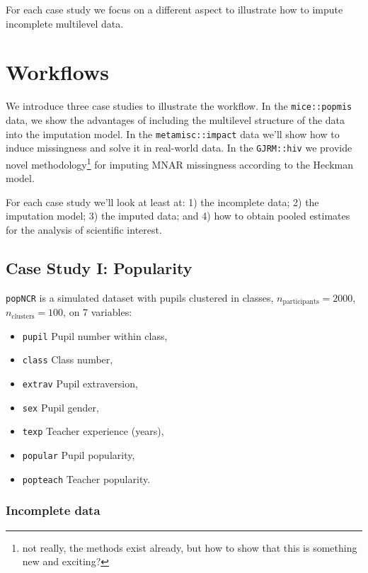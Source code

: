 \documentclass[
]{jss}
\providecommand{\tightlist}{%
  \setlength{\itemsep}{0pt}\setlength{\parskip}{0pt}}
\begin{document}
For each case study we focus on a different aspect to illustrate how to
impute incomplete multilevel data.

\hypertarget{workflows}{%
\section{Workflows}\label{workflows}}

We introduce three case studies to illustrate the workflow. In the
\texttt{mice::popmis} data, we show the advantages of including the
multilevel structure of the data into the imputation model. In the
\texttt{metamisc::impact} data we'll show how to induce missingness and
solve it in real-world data. In the \texttt{GJRM::hiv} we provide novel
methodology\footnote{not really, the methods exist already, but how to
  show that this is something new and exciting?} for imputing MNAR
missingness according to the Heckman model.

For each case study we'll look at least at: 1) the incomplete data; 2)
the imputation model; 3) the imputed data; and 4) how to obtain pooled
estimates for the analysis of scientific interest.

\hypertarget{case-study-i-popularity}{%
\subsection{Case Study I: Popularity}\label{case-study-i-popularity}}

\texttt{popNCR} is a simulated dataset with pupils clustered in classes,
\(n_{\text{participants}} = 2000\), \(n_{\text{clusters}} = 100\), on 7
variables:

\begin{itemize}
\tightlist
\item
  \texttt{pupil} Pupil number within class,
\item
  \texttt{class} Class number,
\item
  \texttt{extrav} Pupil extraversion,
\item
  \texttt{sex} Pupil gender,
\item
  \texttt{texp} Teacher experience (years),
\item
  \texttt{popular} Pupil popularity,
\item
  \texttt{popteach} Teacher popularity.
\end{itemize}

\hypertarget{incomplete-data}{%
\subsubsection{Incomplete data}\label{incomplete-data}}
\end{document}
